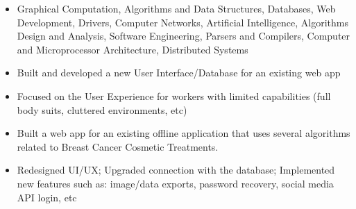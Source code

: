 \documentclass[10pt,a4paper]{altacv}
\begin{document}

\begin{fullwidth}
\makecvheader
\end{fullwidth}

\begin{itemize}
    \item Graphical Computation, Algorithms and Data Structures, Databases, Web Development, Drivers, Computer Networks, Artificial Intelligence, Algorithms Design and Analysis, Software Engineering, Parsers and Compilers, Computer and Microprocessor Architecture, Distributed Systems
\end{itemize}


\begin{itemize}
\item Built and developed a new User Interface/Database for an existing web app
\item Focused on the User Experience for workers with limited capabilities (full body suits, cluttered environments, etc)
\end{itemize}

\vspace{2mm}

\begin{itemize}
\item Built a web app for an existing offline application that uses several algorithms related to Breast Cancer Cosmetic Treatments.
\item Redesigned UI/UX; Upgraded connection with the database; Implemented new features such as: image/data exports, password recovery, social media API login, etc

\end{itemize}

\end{document}
